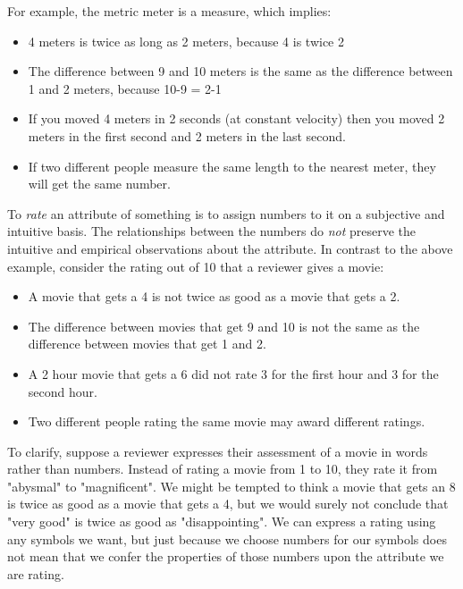 \documentclass{article}
\begin{document}
\begin{enumerate}
For example, the metric meter is a measure, which implies:

\begin{itemize}
\item 4 meters is twice as long as 2 meters, because 4 is twice 2
\item The difference between 9 and 10 meters is the same as the difference
between 1 and 2 meters, because 10-9 = 2-1
\item If you moved 4 meters in 2 seconds (at constant velocity) then you
moved 2 meters in the first second and 2 meters in the last second.\\
\item If two different people measure the same length to the nearest meter,
they will get the same number.
\end{itemize}

To \emph{rate} an attribute of something is to assign numbers to it on a
subjective and intuitive basis. The relationships between the numbers do
\emph{not} preserve the intuitive and empirical observations about the
attribute. In contrast to the above example, consider the rating out of
10 that a reviewer gives a movie:

\begin{itemize}
\item A movie that gets a 4 is not twice as good as a movie that gets a 2.
\item The difference between movies that get 9 and 10 is not the same as
the difference between movies that get 1 and 2.\\
\item A 2 hour movie that gets a 6 did not rate 3 for the first hour and 3
for the second hour.\\
\item Two different people rating the same movie may award different
ratings.
\end{itemize}

To clarify, suppose a reviewer expresses their assessment of a movie in
words rather than numbers. Instead of rating a movie from 1 to 10, they
rate it from "abysmal" to "magnificent". We might be tempted to think a
movie that gets an 8 is twice as good as a movie that gets a 4, but we
would surely not conclude that "very good" is twice as good as
"disappointing". We can express a rating using any symbols we want, but
just because we choose numbers for our symbols does not mean that we
confer the properties of those numbers upon the attribute we are rating.


\end{enumerate}
\end{document}
